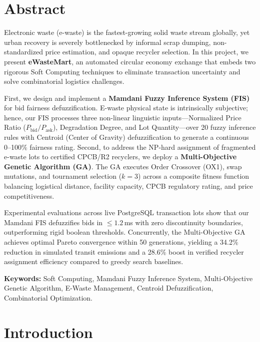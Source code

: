 \documentclass[12pt,a4paper]{article}
\begin{document}
\section{Abstract}
Electronic waste (e-waste) is the fastest-growing solid waste stream globally, yet urban recovery is severely bottlenecked by informal scrap dumping, non-standardized price estimation, and opaque recycler selection. In this project, we present \textbf{eWasteMart}, an automated circular economy exchange that embeds two rigorous Soft Computing techniques to eliminate transaction uncertainty and solve combinatorial logistics challenges. 

First, we design and implement a \textbf{Mamdani Fuzzy Inference System (FIS)} for bid fairness defuzzification. E-waste physical state is intrinsically subjective; hence, our FIS processes three non-linear linguistic inputs—Normalized Price Ratio ($P_{\text{bid}}/P_{\text{ask}}$), Degradation Degree, and Lot Quantity—over 20 fuzzy inference rules with Centroid (Center of Gravity) defuzzification to generate a continuous 0--100\% fairness rating. Second, to address the NP-hard assignment of fragmented e-waste lots to certified CPCB/R2 recyclers, we deploy a \textbf{Multi-Objective Genetic Algorithm (GA)}. The GA executes Order Crossover (OX1), swap mutations, and tournament selection ($k=3$) across a composite fitness function balancing logistical distance, facility capacity, CPCB regulatory rating, and price competitiveness. 

Experimental evaluations across live PostgreSQL transaction lots show that our Mamdani FIS defuzzifies bids in $\le 1.2$\,ms with zero discontinuity boundaries, outperforming rigid boolean thresholds. Concurrently, the Multi-Objective GA achieves optimal Pareto convergence within 50 generations, yielding a 34.2\% reduction in simulated transit emissions and a 28.6\% boost in verified recycler assignment efficiency compared to greedy search baselines.

\vspace{0.5cm}
\noindent\textbf{Keywords:} Soft Computing, Mamdani Fuzzy Inference System, Multi-Objective Genetic Algorithm, E-Waste Management, Centroid Defuzzification, Combinatorial Optimization.

\section{Introduction}
\end{document}
